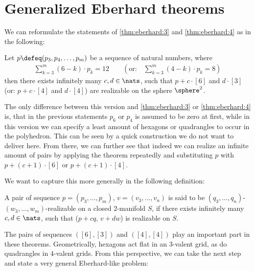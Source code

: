 \section{Generalized {\sc Eberhard} theorems}\label{sec:gen:eberhard}
We can reformulate the statements of \autoref{thm:eberhard:3} and \autoref{thm:eberhard:4} as in the following:
\begin{theorem}
  Let $p \defeq (p_3, p_4, \dots, p_m)$ be a sequence of natural numbers, where
  \begin{align*}
    \sum_{k=3}^m(6 - k) \cdot p_k = 12 \qquad \left( \text{or:}\quad \sum_{k=3}^m(4 - k) \cdot p_k = 8 \right)
  \end{align*}
  then there exists infinitely many $c, d \in \nats$, such that $p + c \cdot [6]$ and $d \cdot [3]$ (or: $p + c \cdot [4]$ and $d \cdot [4]$) are realizable on the sphere $\sphere^2$.
\end{theorem}

\begin{remark}
The only difference between this version and \autoref{thm:eberhard:3} or \autoref{thm:eberhard:4} is, that in the previous statements $p_6$ or $p_4$ is assumed to be zero at first, while in this version we can specify a least amount of hexagons or quadrangles to occur in the polyhedron. This can be seen by a quick construction we do not want to deliver here. From there, we can further see that indeed we can realize an infinite amount of pairs by applying the theorem repeatedly and substituting $p$ with $p + (c + 1) \cdot [6]$ or $p + (c + 1) \cdot [4]$.
\end{remark}

We want to capture this more generally in the following definition:
\begin{definition}\label{def:eberhard:realizable}
  A pair of sequence $p = (p_3, \dots, p_m)$, $v = (v_3, \dots, v_n)$ is said to be $(q_3, \dots, q_n)$-$(w_3, \dots, w_m)$-realizable on a closed $2$-manifold $S$, if there exists infinitely many $c, d \in \nats$, such that ($p + c q$, $v + d w$) is realizable on $S$.
\end{definition}

The pairs of sequences $([6], [3])$ and $([4], [4])$ play an important part in these theorems. Geometrically, hexagons act flat in an $3$-valent grid, as do quadrangles in $4$-valent grids. From this perspective, we can take the next step and state a very general {\sc Eberhard}-like problem:

